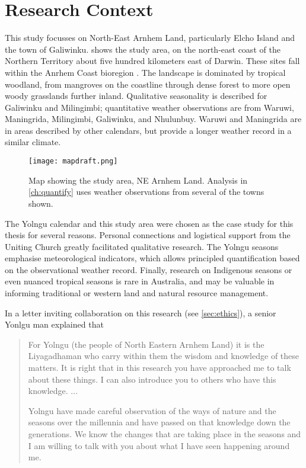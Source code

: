 \section{Research Context}
\label{sec:context}

This study focusses on North-East Arnhem Land, particularly Elcho Island
and the town of Galiwinku.   shows the study
area, on the north-east coast of the Northern Territory about five hundred
kilometers east of Darwin.
%
These sites fall within the Anrhem Coast bioregion \citep{ens2014}.
The landscape is dominated by tropical woodland, from mangroves on the coastline
through dense forest to more open woody grasslands further inland.
%
Qualitative seasonality is described for Galiwinku and Milingimbi;
quantitative weather observations are from Waruwi, Maningrida, Milingimbi,
Galiwinku, and Nhulunbuy.  Waruwi and Maningrida are in areas described by
other calendars, but provide a longer weather record in a similar climate.

\begin{figure}[h]
    \centering
    \texttt{[image: mapdraft.png]}
    \caption[Map showing the study area, NE Arnhem Land]{
        Map showing the study area, NE Arnhem Land.
        Analysis in \cref{ch:quantify} uses weather observations from several of the towns shown.
        }
    \label{fig:arnhem-map}
\end{figure}

The Yolngu calendar and this study area were chosen as the case study for
this thesis for several reasons.  Personal connections and logistical support
from the Uniting Church greatly facilitated qualitative research.  The
Yolngu seasons emphasise meteorological indicators, which allows principled
quantification based on the observational weather record.  Finally, research
on Indigenous seasons or even nuanced tropical seasons is rare in Australia,
and may be valuable in informing traditional or western land and natural
resource management.

In a letter inviting collaboration on this research (see \cref{sec:ethics}),
a senior Yonlgu man explained that \blockquote{
    For Yolngu (the people of North Eastern Arnhem Land) it is the Liyagadhaman
    who carry within them the wisdom and knowledge of these matters.
    It is right that in this research you have approached me to talk about these
    things. I can also introduce you to others who have this knowledge.  ...

    Yolngu have made careful observation of the ways of nature and the seasons
    over the millennia and have passed on that knowledge down the generations.
    We know the changes that are taking place in the seasons and I am willing
    to talk with you about what I have seen happening around me.
}

